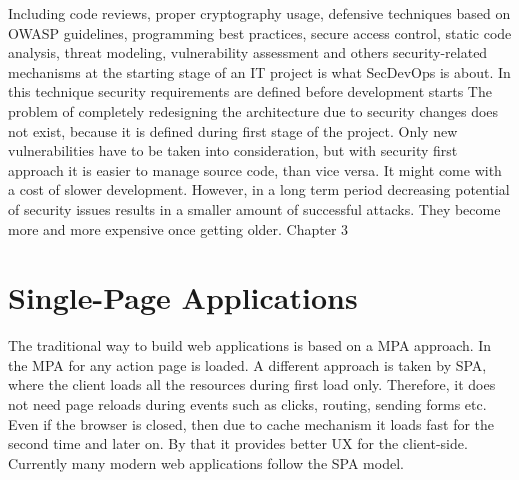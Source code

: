 \documentclass{article} %
\begin{document}
\newline
Including code reviews, proper cryptography usage, defensive techniques based on OWASP guidelines, programming best practices, secure access control, static code analysis, threat modeling, vulnerability assessment and others security-related mechanisms at the starting stage of an IT project is what SecDevOps is about. In this technique security requirements are defined before development starts The problem of completely redesigning the architecture due to security changes does not exist, because it is defined during first stage of the project. Only new vulnerabilities have to be taken into consideration, but with security first approach it is easier to manage source code, than vice versa. It might come with a cost of slower development. However, in a long term period decreasing potential of security issues results in a smaller amount of successful attacks. They become more and more expensive once getting older.
\newpage
\huge Chapter 3
\section{Single-Page Applications}
\normalsize The traditional way to build web applications is based on a MPA approach. In the MPA for any action page is loaded. A different approach is taken by SPA, where the client loads all the resources during first load only. Therefore, it does not need page reloads during events such as clicks, routing, sending forms etc. Even if the browser is closed, then due to cache mechanism it loads fast for the second time and later on. By that it provides better UX for the client-side. Currently many modern web applications follow the SPA model.
\end{document}
